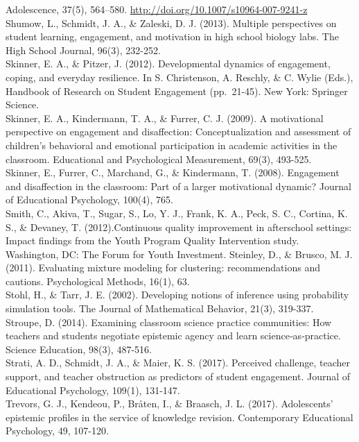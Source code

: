 \documentclass[]{msu-thesis}
\theoremstyle{definition}
\theoremstyle{definition}
\theoremstyle{definition}
\theoremstyle{remark}
\begin{document}
Adolescence, 37(5), 564--580.
\url{http://doi.org/10.1007/s10964-007-9241-z}\\
Shumow, L., Schmidt, J. A., \& Zaleski, D. J. (2013). Multiple
perspectives on student learning, engagement, and motivation in high
school biology labs. The High School Journal, 96(3), 232-252.\\
Skinner, E. A., \& Pitzer, J. (2012). Developmental dynamics of
engagement, coping, and everyday resilience. In S. Christenson, A.
Reschly, \& C. Wylie (Eds.), Handbook of Research on Student Engagement
(pp.~21-45). New York: Springer Science.\\
Skinner, E. A., Kindermann, T. A., \& Furrer, C. J. (2009). A
motivational perspective on engagement and disaffection:
Conceptualization and assessment of children's behavioral and emotional
participation in academic activities in the classroom. Educational and
Psychological Measurement, 69(3), 493-525.\\
Skinner, E., Furrer, C., Marchand, G., \& Kindermann, T. (2008).
Engagement and disaffection in the classroom: Part of a larger
motivational dynamic? Journal of Educational Psychology, 100(4), 765.\\
Smith, C., Akiva, T., Sugar, S., Lo, Y. J., Frank, K. A., Peck, S. C.,
Cortina, K. S., \& Devaney, T. (2012).Continuous quality improvement in
afterschool settings: Impact findings from the Youth Program Quality
Intervention study. Washington, DC: The Forum for Youth Investment.
Steinley, D., \& Brusco, M. J. (2011). Evaluating mixture modeling for
clustering: recommendations and cautions. Psychological Methods, 16(1),
63.\\
Stohl, H., \& Tarr, J. E. (2002). Developing notions of inference using
probability simulation tools. The Journal of Mathematical Behavior,
21(3), 319-337.\\
Stroupe, D. (2014). Examining classroom science practice communities:
How teachers and students negotiate epistemic agency and learn
science‐as‐practice. Science Education, 98(3), 487-516.\\
Strati, A. D., Schmidt, J. A., \& Maier, K. S. (2017). Perceived
challenge, teacher support, and teacher obstruction as predictors of
student engagement. Journal of Educational Psychology, 109(1),
131-147.\\
Trevors, G. J., Kendeou, P., Bråten, I., \& Braasch, J. L. (2017).
Adolescents' epistemic profiles in the service of knowledge revision.
Contemporary Educational Psychology, 49, 107-120.\\
\end{document}
